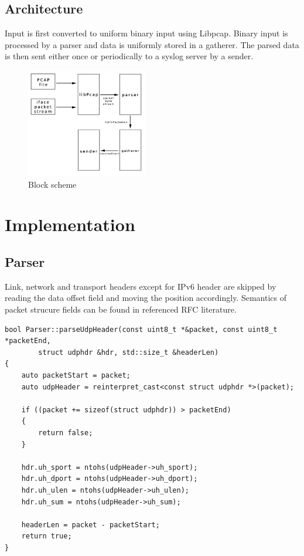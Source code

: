 \documentclass[a4paper, 12pt]{article}
\begin{document}
\subsection{Architecture}
Input is first converted to uniform binary input using Libpcap. Binary input is processed by a parser and data is uniformly stored in a gatherer. The parsed data is then sent either once or periodically to a syslog server by a sender.
\begin{figure}[h]
    \centering
    \includegraphics[width=200px]{block_scheme.png}
    \caption{Block scheme}
    \label{fig:block scheme}
\end{figure}


\newpage
\section{Implementation}
\subsection{Parser}
Link, network and transport headers except for IPv6 header are skipped by reading the data offset field and moving the position accordingly. Semantics of packet strucure fields can be found in referenced RFC literature.
\begin{lstlisting}
bool Parser::parseUdpHeader(const uint8_t *&packet, const uint8_t *packetEnd,
        struct udphdr &hdr, std::size_t &headerLen)
{
    auto packetStart = packet;
    auto udpHeader = reinterpret_cast<const struct udphdr *>(packet);

    if ((packet += sizeof(struct udphdr)) > packetEnd)
    {
        return false;
    }

    hdr.uh_sport = ntohs(udpHeader->uh_sport);
    hdr.uh_dport = ntohs(udpHeader->uh_dport);
    hdr.uh_ulen = ntohs(udpHeader->uh_ulen);
    hdr.uh_sum = ntohs(udpHeader->uh_sum);

    headerLen = packet - packetStart;
    return true;
}
\end{lstlisting}
\end{document}
